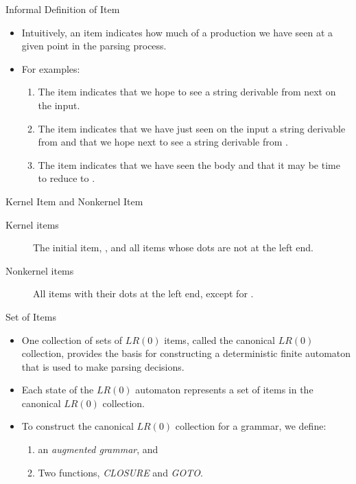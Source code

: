 \begin{bibunit}[apalike]
\begin{frame}{Informal Definition of Item}
	\begin{itemize}
	\item Intuitively, an item indicates how much of a production we have seen at a given point in the parsing process.
	\vfill
	\item For examples:
		\begin{enumerate}
		\item The item  indicates that we hope to see a string derivable from  next on the input.
		\item The item  indicates that we have just seen on the input a string derivable from  and that we hope next to see a string derivable from .
		\item The item  indicates that we have seen the body  and that it may be time to reduce  to .
		\end{enumerate}
	\end{itemize}
\end{frame}

\begin{frame}{Kernel Item and Nonkernel Item}
	\begin{description}
	\item[Kernel items] The initial item, , and all items whose dots are not at the left end.
	\vspace{4em}
	\item[Nonkernel items] All items with their dots at the left end, except for .
	\end{description}
\end{frame}

\begin{frame}{Set of Items}
	\begin{itemize}
	\item One collection of sets of $LR(0)$ items, called the canonical $LR(0)$ collection, provides the basis for constructing a deterministic finite automaton that is used to make parsing decisions.
	\item Each state of the $LR(0)$ automaton represents a set of items in the canonical $LR(0)$ collection.
	\vfill
	\item To construct the canonical $LR(0)$ collection for a grammar, we define:
		\begin{enumerate}
		\item an \emph{augmented grammar}, and
		\item Two functions, \emph{CLOSURE} and \emph{GOTO}.
		\end{enumerate}
	\end{itemize}
\end{frame}


\end{bibunit}
